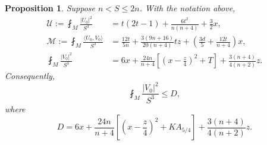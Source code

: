 \documentclass[11pt,reqno]{amsart}
\numberwithin{equation}{section}
\newtheorem{proposition}[theorem]{Proposition}
\newcommand{\ip}[2]{\langle #1,#2\rangle}
\newcommand{\norm}[1]{\lvert #1\rvert}
\begin{document}
\begin{proposition}\label{prop:fourth}
Suppose $n<S\le2n$. With the notation above,
\begin{align}
\mathcal U
:=\fint_M\frac{\norm{U_0}^2}{S^3}
&=t(2t-1)+\frac{6t^2}{n(n+4)}+\frac32x,
\label{eq:calU}\\
\mathcal M
:=\fint_M\frac{\ip{U_0}{V_0}}{S^3}
&=\frac{12t}{5n}
+\frac{3(9n+16)}{20(n+4)}tz
+\left(\frac{3d}{5}+\frac{12t}{n+4}\right)x,
\label{eq:calM}\\
\fint_M\frac{\norm{V_0}^2}{S^3}
&=6x+\frac{24n}{n+4}
\left[\left(x-\frac z4\right)^2+T\right]
+\frac{3(n+4)}{4(n+2)}z.
\label{eq:V0norm}
\end{align}
Consequently,
\begin{equation}\label{eq:V0D}
\fint_M\frac{\norm{V_0}^2}{S^3}\le D,
\end{equation}
where
\[
D=
6x+\frac{24n}{n+4}
\left[
\left(x-\frac z4\right)^2+KA_{5/4}
\right]
+\frac{3(n+4)}{4(n+2)}z.
\]
\end{proposition}
\end{document}
